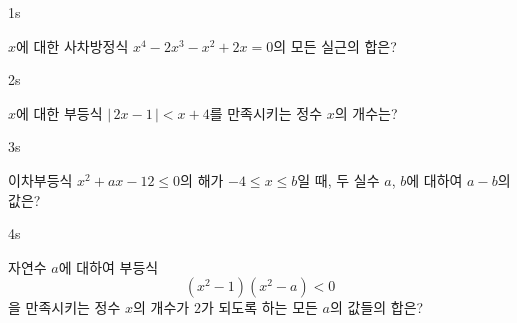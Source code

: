 \documentclass[10pt]{article}
\begin{document}


\begin{pagepair}

\begin{problem}{1}{s}
\par\smallskip
$x$에 대한 사차방정식 $x^4 - 2x^3 - x^2 + 2x = 0$의 모든 실근의 합은?
\begin{choices}
\end{choices}
\end{problem}

\begin{problem}{2}{s}
\par\smallskip
$x$에 대한 부등식 $|\,2x - 1\,| < x + 4$를 만족시키는 정수 $x$의 개수는?
\begin{choices}
\end{choices}
\end{problem}

\end{pagepair}

\begin{pagepair}

\begin{problem}{3}{s}
\par\smallskip
이차부등식 $x^2 + ax - 12 \le 0$의 해가 $-4 \le x \le b$일 때, 두 실수 $a$, $b$에 대하여 $a - b$의 값은?
\begin{choices}
\end{choices}
\end{problem}

\begin{problem}{4}{s}
\par\smallskip
자연수 $a$에 대하여 부등식
$$(x^2 - 1)(x^2 - a) < 0$$
을 만족시키는 정수 $x$의 개수가 $2$가 되도록 하는 모든 $a$의 값들의 합은?
\begin{choices}
\end{choices}
\end{problem}

\end{pagepair}
\end{document}
